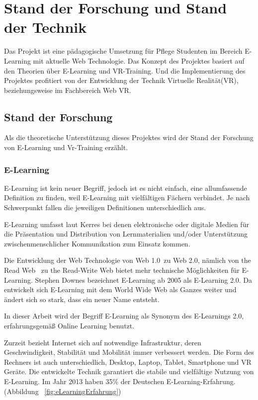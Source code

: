 \chapter{Stand der Forschung und Stand der Technik}

Das Projekt ist eine pädagogische Umsetzung für Pflege Studenten im Bereich E-Learning mit aktuelle Web Technologie. Das Konzept des Projektes basiert auf den Theorien über E-Learning und VR-Training. Und die Implementierung des Projektes profitiert von der Entwicklung der Technik Virtuelle Realität(VR), beziehungsweise im Fachbereich Web VR.

\section{Stand der Forschung}

Als die theoretische Unterstützung dieses Projektes wird der Stand der Forschung von E-Learning und Vr-Training erzählt.

 \subsection{E-Learning}
 E-Learning ist kein neuer Begriff, jedoch ist es nicht einfach, eine allumfassende Definition zu finden, weil E-Learning mit vielfältigen Fächern verbindet. Je nach Schwerpunkt fallen die jeweiligen Definitionen unterschiedlich aus.

E-Learning umfasst laut Kerres \citep{1} \glqq bei denen elektronische oder digitale Medien für die Präsentation und Distribution von Lernmaterialien und/oder Unterstützung zwischenmenschlicher Kommunikation zum Einsatz kommen.\grqq

Die Entwicklung der Web Technologie von \glqq Web 1.0\grqq\ zu \glqq Web 2.0\grqq  \citep{3}, nämlich von \glqq the Read Web \grqq\ zu \glqq the Read-Write Web\grqq \citep{4} bietet mehr technische Möglichkeiten für E-Learning. Stephen Downes \citep{2} bezeichnet E-Learning ab 2005 als E-Learning 2.0. Da \glqq entwickelt sich E-Learning mit dem World Wide Web als Ganzes weiter und ändert sich so stark, dass ein neuer Name entsteht.\grqq

In dieser Arbeit wird der Begriff E-Learning als Synonym des E-Learnings 2.0, erfahrungsgemäß Online Learning benutzt.
 
Zurzeit bezieht Internet sich auf notwendige Infrastruktur, deren Geschwindigkeit, Stabilität und Mobilität immer verbessert werden. Die Form des Rechners ist auch unterschiedlich, Desktop, Laptop, Tablet, Smartphone und VR Geräte. Die entwickelte Technik garantiert die stabile und vielfältige Nutzung von E-Learning. Im Jahr 2013 haben 35\% der Deutschen E-Learning-Erfahrung. (Abbildung ~\ref{fig:eLearningErfahrung})

